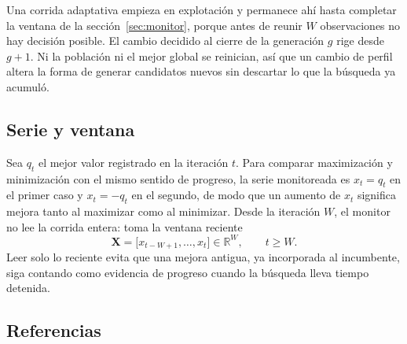 \documentclass[runningheads]{llncs}
\begin{document}
Una corrida adaptativa empieza en explotación y permanece ahí hasta completar la ventana de la sección~\ref{sec:monitor}, porque antes de reunir $W$ observaciones no hay decisión posible. El cambio decidido al cierre de la generación $g$ rige desde $g+1$. Ni la población ni el mejor global se reinician, así que un cambio de perfil altera la forma de generar candidatos nuevos sin descartar lo que la búsqueda ya acumuló.


\subsection{Serie y ventana}
\label{sec:ventana}

Sea $q_t$ el mejor valor registrado en la iteración $t$. Para comparar maximización y minimización con el mismo sentido de progreso, la serie monitoreada es $x_t = q_t$ en el primer caso y $x_t = -q_t$ en el segundo, de modo que un aumento de $x_t$ significa mejora tanto al maximizar como al minimizar. Desde la iteración $W$, el monitor no lee la corrida entera: toma la ventana reciente
\begin{equation}
\mathbf{X} = \bigl[x_{t-W+1}, \ldots, x_t\bigr] \in \mathbb{R}^{W}, \qquad t \ge W.
\label{eq:ventana}
\end{equation}
Leer solo lo reciente evita que una mejora antigua, ya incorporada al incumbente, siga contando como evidencia de progreso cuando la búsqueda lleva tiempo detenida.

\subsection{Referencias}
\label{sec:referencias}
\end{document}
